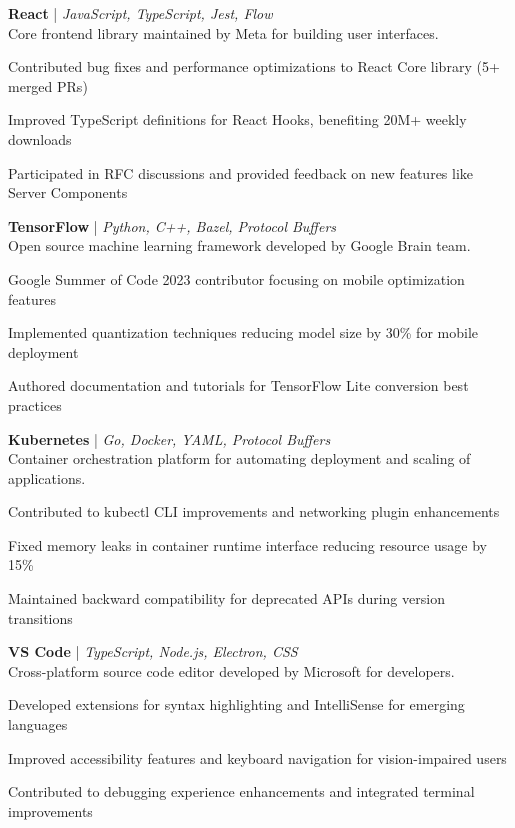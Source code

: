\noindent\textbf{React} | \emph{JavaScript, TypeScript, Jest, Flow}\\
Core frontend library maintained by Meta for building user interfaces.
\begin{tightitemize}
  \item Contributed bug fixes and performance optimizations to React Core library (5+ merged PRs)
  \item Improved TypeScript definitions for React Hooks, benefiting 20M+ weekly downloads
  \item Participated in RFC discussions and provided feedback on new features like Server Components
\end{tightitemize}

\vspace{0.3em}
\noindent\textbf{TensorFlow} | \emph{Python, C++, Bazel, Protocol Buffers}\\
Open source machine learning framework developed by Google Brain team.
\begin{tightitemize}
  \item Google Summer of Code 2023 contributor focusing on mobile optimization features
  \item Implemented quantization techniques reducing model size by 30\% for mobile deployment
  \item Authored documentation and tutorials for TensorFlow Lite conversion best practices
\end{tightitemize}

\vspace{0.3em}
\noindent\textbf{Kubernetes} | \emph{Go, Docker, YAML, Protocol Buffers}\\
Container orchestration platform for automating deployment and scaling of applications.
\begin{tightitemize}
  \item Contributed to kubectl CLI improvements and networking plugin enhancements
  \item Fixed memory leaks in container runtime interface reducing resource usage by 15\%
  \item Maintained backward compatibility for deprecated APIs during version transitions
\end{tightitemize}

\vspace{0.3em}
\noindent\textbf{VS Code} | \emph{TypeScript, Node.js, Electron, CSS}\\
Cross-platform source code editor developed by Microsoft for developers.
\begin{tightitemize}
  \item Developed extensions for syntax highlighting and IntelliSense for emerging languages
  \item Improved accessibility features and keyboard navigation for vision-impaired users
  \item Contributed to debugging experience enhancements and integrated terminal improvements
\end{tightitemize}